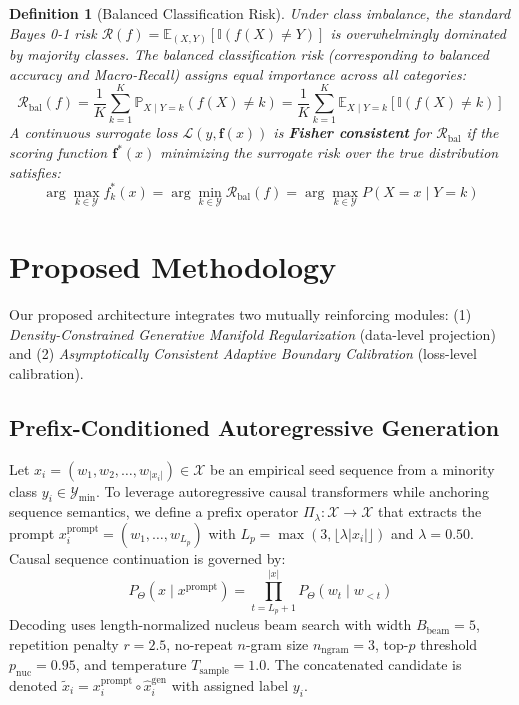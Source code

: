 \documentclass[final,5p,times,twocolumn]{elsarticle}
\newtheorem{definition}{Definition}
\begin{document}
\begin{definition}[Balanced Classification Risk]
Under class imbalance, the standard Bayes 0-1 risk $\mathcal{R}(f) = \mathbb{E}_{(X, Y)}[\mathbb{I}(f(X) \neq Y)]$ is overwhelmingly dominated by majority classes. The balanced classification risk (corresponding to balanced accuracy and Macro-Recall) assigns equal importance across all categories:
\begin{equation}
    \mathcal{R}_{\text{bal}}(f) = \frac{1}{K} \sum_{k=1}^K \mathbb{P}_{X \mid Y=k}(f(X) \neq k) = \frac{1}{K} \sum_{k=1}^K \mathbb{E}_{X \mid Y=k}[\mathbb{I}(f(X) \neq k)]
\end{equation}
A continuous surrogate loss $\mathcal{L}(y, \mathbf{f}(x))$ is \textbf{Fisher consistent} for $\mathcal{R}_{\text{bal}}$ if the scoring function $\mathbf{f}^*(x)$ minimizing the surrogate risk over the true distribution satisfies:
\begin{equation}
    \arg\max_{k \in \mathcal{Y}} f_k^*(x) = \arg\min_{k \in \mathcal{Y}} \mathcal{R}_{\text{bal}}(f) = \arg\max_{k \in \mathcal{Y}} P(X=x \mid Y=k)
\end{equation}
\end{definition}

\section{Proposed Methodology}
\label{sec:methodology}

Our proposed architecture integrates two mutually reinforcing modules: (1) \textit{Density-Constrained Generative Manifold Regularization} (data-level projection) and (2) \textit{Asymptotically Consistent Adaptive Boundary Calibration} (loss-level calibration).

\subsection{Prefix-Conditioned Autoregressive Generation}
\label{subsec:continuation}

Let $x_i = (w_1, w_2, \dots, w_{|x_i|}) \in \mathcal{X}$ be an empirical seed sequence from a minority class $y_i \in \mathcal{Y}_{\text{min}}$. To leverage autoregressive causal transformers while anchoring sequence semantics, we define a prefix operator $\Pi_\lambda: \mathcal{X} \to \mathcal{X}$ that extracts the prompt $x_i^{\text{prompt}} = (w_1, \dots, w_{L_p})$ with $L_p = \max(3, \lfloor \lambda |x_i| \rfloor)$ and $\lambda = 0.50$. Causal sequence continuation is governed by:
\begin{equation}
    P_\Theta(x \mid x^{\text{prompt}}) = \prod_{t=L_p+1}^{|x|} P_\Theta(w_t \mid w_{<t})
\end{equation}
Decoding uses length-normalized nucleus beam search with width $B_{\text{beam}}=5$, repetition penalty $r=2.5$, no-repeat $n$-gram size $n_{\text{ngram}}=3$, top-$p$ threshold $p_{\text{nuc}}=0.95$, and temperature $T_{\text{sample}}=1.0$. The concatenated candidate is denoted $\tilde{x}_i = x_i^{\text{prompt}} \circ \hat{x}_i^{\text{gen}}$ with assigned label $y_i$.
\end{document}

